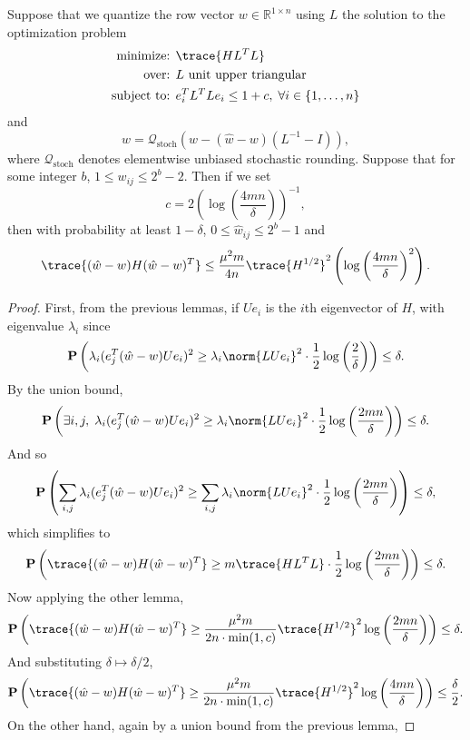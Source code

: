 \begin{toappendix}
\begin{lemma}
Suppose that we quantize the row vector $w \in \mathbb{R}^{1 \times n}$ using $L$ the solution to the optimization problem
\begin{align*}
    \mbox{minimize: } & \trace{H L^T L} \\
    \mbox{over: } & L \text{ unit upper triangular} \\
    \mbox{subject to: } & e_i^T L^T L e_i \le 1 + c, \; \forall i \in \{1,\ldots,n\}
\end{align*}
and
\[
	\hat w = \mathcal{Q}_{\operatorname{stoch}}\left( w - (\hat w - w) (L^{-1} - I) \right),
\]
where $\mathcal{Q}_{\operatorname{stoch}}$ denotes elementwise unbiased stochastic rounding.
Suppose that for some integer $b$, $1 \le w_{ij} \le 2^{b} - 2$.
Then if we set
\[
	c = 2 \left( \log\left( \frac{4 m n}{\delta} \right) \right)^{-1},
\]
then with probability at least $1 - \delta$, $0 \le \hat w_{ij} \le 2^{b} - 1$ and
\[
	\trace{ (\hat w - w) H (\hat w - w)^T } \le \frac{\mu^2 m}{4n} \trace{H^{1/2}}^2 \left( \log\left( \frac{4 mn}{\delta}\right)^2 \right).
\]
\end{lemma}
\begin{proof}
First, from the previous lemmas, if $U e_i$ is the $i$th eigenvector of $H$, with eigenvalue $\lambda_i$ since
\[
	\mathbf{P}\left( \lambda_i ( e_j^T (\hat w - w) U e_i )^2 \ge \lambda_i \norm{L U e_i}^2 \cdot \frac{1}{2} \log\left( \frac{2}{\delta} \right) \right) \le \delta.
\]
By the union bound,
\[
	\mathbf{P}\left( \exists i,j, \; \lambda_i ( e_j^T (\hat w - w) U e_i )^2 \ge \lambda_i \norm{L U e_i}^2 \cdot \frac{1}{2} \log\left( \frac{2 mn}{\delta} \right) \right) \le \delta.
\]
And so
\[
	\mathbf{P}\left( \sum_{i,j} \lambda_i ( e_j^T (\hat w - w) U e_i )^2 \ge \sum_{i,j} \lambda_i \norm{L U e_i}^2 \cdot \frac{1}{2} \log\left( \frac{2 mn}{\delta} \right) \right) \le \delta,
\]
which simplifies to
\[
	\mathbf{P}\left( \trace{ (\hat w - w) H (\hat w - w)^T } \ge m \trace{H L^T L} \cdot \frac{1}{2} \log\left( \frac{2 mn}{\delta} \right) \right) \le \delta.
\]
Now applying the other lemma,
\[
	\mathbf{P}\left( \trace{ (\hat w - w) H (\hat w - w)^T } \ge \frac{\mu^2 m}{2n \cdot \min(1,c)} \trace{H^{1/2}}^2 \log\left( \frac{2 mn}{\delta} \right) \right) \le \delta.
\]
And substituting $\delta \mapsto \delta/2$,
\[
	\mathbf{P}\left( \trace{ (\hat w - w) H (\hat w - w)^T } \ge \frac{\mu^2 m}{2n \cdot \min(1,c)} \trace{H^{1/2}}^2 \log\left( \frac{4 mn}{\delta} \right) \right) \le \frac{\delta}{2}.
\]
On the other hand, again by a union bound from the previous lemma,

\end{proof}
\end{toappendix}
